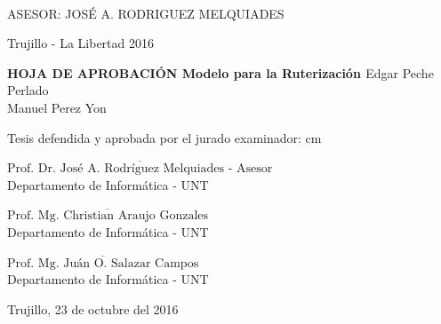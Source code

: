 \begin{center}
   {\bf {\fontsize{14}{16.8}\selectfont{JUAN POLO COSME}}}\\    
      {\bf {\fontsize{14}{16.8}\selectfont{MARLON SANCHEZ CHAVEZ}}}       
   \end{center}   

\vskip 3.2cm
\begin{center}
   {\bf \doublespacing {\fontsize{17}{20.4}\selectfont{RECONOCIMIENTO AUTOMÁTICO DE SEÑALES DE TRÁNSITO MEDIANTE PROCESAMIENTO DE IMÁGENES Y RED NEURONAL PERCEPTRÓN MULTICAPA}}}     
\end{center}   
  \vskip 2cm
\begin{verse}
 \fontsize{12}{14.4}
\end{verse}

\vskip 1.5cm 
{\fontsize{14}{16.8}\selectfont ASESOR: JOSÉ A. RODRIGUEZ MELQUIADES} 
 \vskip 1cm 
 \begin{center}    
 \vskip 2cm
{\fontsize{14}{16.8}\selectfont Trujillo - La Libertad
\vskip 0.2cm
\hspace*{-0.2cm} 
2016}
\end{center} 
\newpage


\begin{center}
 {\bf {\Large HOJA DE APROBACIÓN }     
 \vskip 1.5cm
  {\Large Modelo para la Ruterización }}
 \vskip 1cm 
  {\large{Edgar Peche Perlado}}\\
    {\large{Manuel Perez Yon}}

 \vskip 1cm
\end{center} 
Tesis defendida y aprobada por el jurado examinador:
 cm
\begin{flushleft} 
$\overline{\mbox{Prof. Dr. José A. Rodríguez Melquiades - Asesor}}$\\
\vskip -0.5cm
Departamento de Informática - UNT
\end{flushleft} 
\vskip 1cm
\begin{flushleft} 
$\overline{\mbox{Prof. Mg. Christian Araujo Gonzales}}$\\
\vskip -0.5cm
Departamento de Informática - UNT
\end{flushleft} 
\vskip 1cm
\begin{flushleft} 
$\overline{\mbox{Prof. Mg. Juán O. Salazar Campos}}$\\
\vskip -0.5cm
Departamento de Informática - UNT
\end{flushleft}
\vskip 0.8cm 
\begin{center}    
Trujillo, 23 de octubre del 2016
\end{center} 
\newpage


